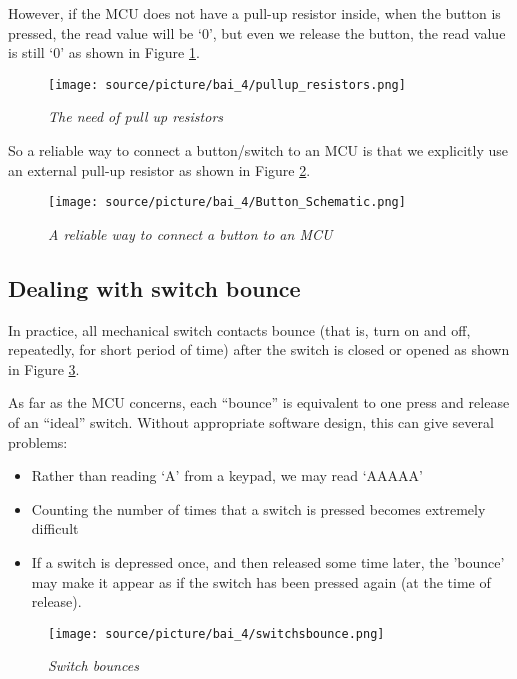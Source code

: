  However, if the MCU does not have a pull-up resistor inside, when the button is pressed, the read value will be `0', but even we release the button, the read value is still `0' as shown in Figure \ref{bai4_pic_the_need_of_pull_up_resistors}.
 \begin{figure}[!htp]
    \centering
    \texttt{[image: source/picture/bai\_4/pullup\_resistors.png]}
    \caption{\textit{The need of pull up resistors}}
    \label{bai4_pic_the_need_of_pull_up_resistors}
\end{figure}

So a reliable way to connect a button/switch to an MCU is that we explicitly use an external pull-up resistor as shown in Figure \ref{bai4_pic_button_schematic_1}.

 \begin{figure}[!htp]
    \centering
    \texttt{[image: source/picture/bai\_4/Button\_Schematic.png]}
    \caption{\textit{A reliable way to connect a button to an MCU}}
    \label{bai4_pic_button_schematic_1}
\end{figure}
 
 
\subsection{Dealing with switch bounce}
In practice, all mechanical switch contacts bounce (that is, turn on and off, repeatedly, for short period of time) after the switch is closed or opened as shown in Figure \ref{bai4_pic_switchsbounce}.

As far as the MCU concerns, each “bounce” is equivalent to one press and release of an “ideal” switch. 
Without appropriate software design, this can give several problems:
\begin{itemize}
    \item Rather than reading ‘A’ from a keypad, we may read ‘AAAAA’
    \item Counting the number of times that a switch is pressed becomes extremely difficult
    \item If a switch is depressed once, and then released some time later, the 'bounce' may make it appear as if the switch has been pressed again (at the time of release). 
\end{itemize}
\begin{figure}[!htp]
    \centering
    \texttt{[image: source/picture/bai\_4/switchsbounce.png]}
    \caption{\textit{Switch bounces}}
    \label{bai4_pic_switchsbounce}
\end{figure}



